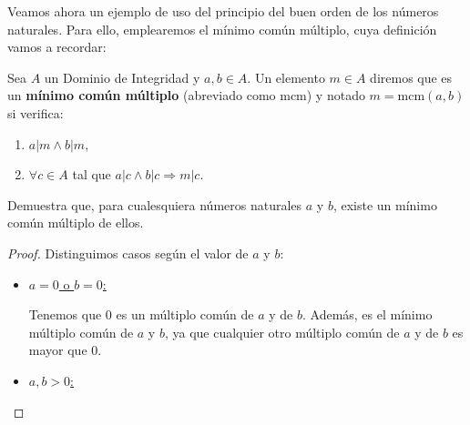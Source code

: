 Veamos ahora un ejemplo de uso del principio del buen orden de los números naturales.
Para ello, emplearemos el mínimo común múltiplo, cuya definición vamos a recordar:
\begin{definicion}
    Sea $A$ un Dominio de Integridad y $a, b \in A$. Un elemento $m \in A$ diremos que es un \textbf{mínimo común múltiplo} (abreviado como $\text{mcm}$) y notado $m = \text{mcm}(a,b)$ si verifica:
    \begin{enumerate}
        \item $a|m \land b|m$,
        \item $\forall c \in A$ tal que $a|c \land b|c \Longrightarrow m|c$.
    \end{enumerate}
\end{definicion}
\begin{ejercicio}
    Demuestra que, para cualesquiera números naturales $a$ y $b$, existe un mínimo
    común múltiplo de ellos.
    \begin{proof}
        Distinguimos casos según el valor de $a$ y $b$:
        \begin{itemize}
            \item \ul{$a = 0$ o $b = 0$:}
            
            Tenemos que $0$ es un múltiplo común de $a$ y de $b$. Además, es el mínimo múltiplo común de $a$ y $b$, ya que cualquier otro múltiplo común de $a$ y de $b$ es mayor que $0$.

            \item \ul{$a,b > 0$:}
            

\end{itemize}
\end{proof}
\end{ejercicio}
